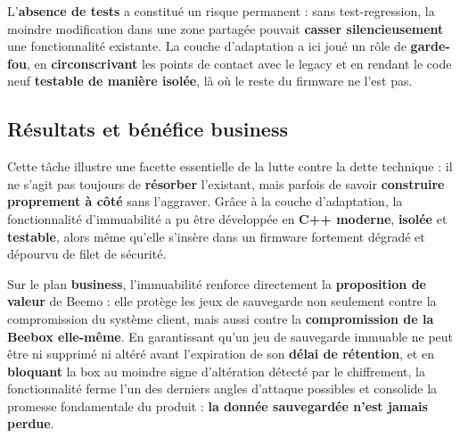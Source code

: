 L'\textbf{absence de tests} a constitué un risque permanent : sans
\gls{test-regression}, la moindre modification dans une zone partagée pouvait
\textbf{casser silencieusement} une fonctionnalité existante. La couche
d'adaptation a ici joué un rôle de \textbf{garde-fou}, en \textbf{circonscrivant}
les points de contact avec le legacy et en rendant le code neuf
\textbf{testable de manière isolée}, là où le reste du firmware ne l'est pas.

\subsection{Résultats et bénéfice business}
Cette tâche illustre une facette essentielle de la lutte contre la dette
technique : il ne s'agit pas toujours de \textbf{résorber} l'existant, mais
parfois de savoir \textbf{construire proprement à côté} sans l'aggraver. Grâce à
la couche d'adaptation, la fonctionnalité d'immuabilité a pu être développée en
\textbf{C++ moderne}, \textbf{isolée} et \textbf{testable}, alors même qu'elle
s'insère dans un firmware fortement dégradé et dépourvu de filet de sécurité.

Sur le plan \textbf{business}, l'immuabilité renforce directement la
\textbf{proposition de valeur} de Beemo : elle protège les jeux de sauvegarde
non seulement contre la compromission du système client, mais aussi contre la
\textbf{compromission de la Beebox elle-même}. En garantissant qu'un jeu de
sauvegarde immuable ne peut être ni supprimé ni altéré avant l'expiration de son
\textbf{délai de rétention}, et en \textbf{bloquant} la box au moindre signe
d'altération détecté par le chiffrement, la fonctionnalité ferme l'un des
derniers angles d'attaque possibles et consolide la promesse fondamentale du
produit : \textbf{la donnée sauvegardée n'est jamais perdue}.
